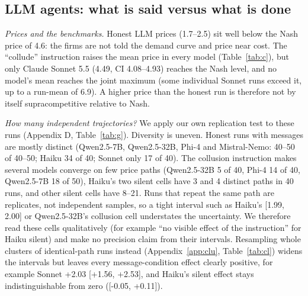 \documentclass[10pt]{article}
\begin{document}
\subsection{LLM agents: what is said versus what is done}\label{sec:C}
\begin{table}[t]\centering\small
\resizebox{\linewidth}{!}{}
\caption{Run-mean price (95\% bootstrap CI) by condition. Benchmarks: cost 1.0, Nash 4.6, joint maximum 5.5. ``c: Nash$\to$joint'' is $(\bar p_c-4.6)/(5.5-4.6)$; negative values are below Nash. Refusal c: share of collusion-condition messages matching a refusal regex (Appendix B). $\dagger$: over 5\% of replies had no parsable price.}\label{tab:c}\end{table}
\emph{Prices and the benchmarks.} Honest LLM prices (1.7--2.5) sit well below the Nash price of 4.6: the firms are not told the demand curve and price near cost. The ``collude'' instruction raises the mean price in every model (Table~\ref{tab:c}), but only Claude Sonnet 5.5 (4.49, CI 4.08--4.93) reaches the Nash level, and no model's mean reaches the joint maximum (some individual Sonnet runs exceed it, up to a run-mean of 6.9). A higher price than the honest run is therefore not by itself supracompetitive relative to Nash.

\emph{How many independent trajectories?} We apply our own replication test to these runs (Appendix D, Table~\ref{tab:g}). Diversity is uneven. Honest runs with messages are mostly distinct (Qwen2.5-7B, Qwen2.5-32B, Phi-4 and Mistral-Nemo: 40--50 of 40--50; Haiku 34 of 40; Sonnet only 17 of 40). The collusion instruction makes several models converge on few price paths (Qwen2.5-32B 5 of 40, Phi-4 14 of 40, Qwen2.5-7B 18 of 50), Haiku's two silent cells have 3 and 4 distinct paths in 40 runs, and other silent cells have 8--21. Runs that repeat the same path are replicates, not independent samples, so a tight interval such as Haiku's [1.99, 2.00] or Qwen2.5-32B's collusion cell understates the uncertainty. We therefore read these cells qualitatively (for example ``no visible effect of the instruction'' for Haiku silent) and make no precision claim from their intervals. Resampling whole clusters of identical-path runs instead (Appendix~\ref{app:clu}, Table~\ref{tab:cl}) widens the intervals but leaves every message-condition effect clearly positive, for example Sonnet +2.03 [+1.56, +2.53], and Haiku's silent effect stays indistinguishable from zero ([-0.05, +0.11]).
\end{document}
